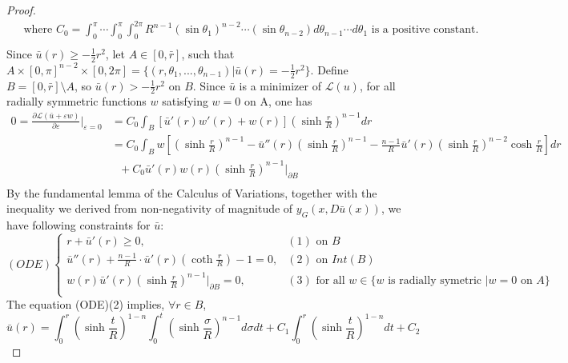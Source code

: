 \begin{proof}
\begin{equation*}
\begin{split}
	&\text{ where }	C_0=\int_{0}^{\pi}\cdots\int_{0}^{\pi}\int_{0}^{2\pi}R^{n-1}(\sin \theta_1)^{n-2}\cdots (\sin\theta_{n-2}) d\theta_{n-1}\cdots d\theta_1 \text{ is a positive constant.} \\
	\end{split}
	\end{equation*}
	Since $\bar{u}(r)\ge -\frac{1}{2}r^2$, let $A\in [0,\bar{r}]$, such that $A\times[0,\pi]^{n-2}\times[0,2\pi] = \{(r,\theta_1, ...,\theta_{n-1})| \bar{u}(r) = -\frac{1}{2}r^2\}$. Define $B =[0,\bar{r}]\setminus A$, so $\bar{u}(r)> -\frac{1}{2}r^2$ on $B$. Since $\bar{u}$ is a minimizer of $\mathcal{L}(u)$, for all radially symmetric functions $w$ satisfying $w=0$ on A, one has
	\begin{equation*}
	\begin{split}
	0=\frac{\partial \mathcal{L}(\bar{u}+\varepsilon w)}{\partial \varepsilon}\bigg|_{\varepsilon=0} &= C_0\int_B [\bar{u}'(r)w'(r)+w(r)](\sinh\frac{r}{R})^{n-1}dr\\
	&=C_0 \int_B w[(\sinh\frac{r}{R})^{n-1}-\bar{u}''(r)(\sinh\frac{r}{R})^{n-1}- \frac{n-1}{R}\bar{u}'(r)(\sinh\frac{r}{R})^{n-2}\cosh\frac{r}{R}]dr\\& \ \ \  +C_0 \bar{u}'(r)w(r)(\sinh\frac{r}{R})^{n-1}\bigg|_{\partial B}\\
	\end{split}
	\end{equation*}
	By the fundamental lemma of the Calculus of Variations, together with the inequality we derived from non-negativity of magnitude of $y_G(x, D\bar{u}(x))$, we have following constraints for $\bar{u}$:
	\begin{equation*}
	(ODE) \begin{cases} 
	r+\bar{u}'(r) \ge 0, & (1)\mbox{ on } B \\ 
	\bar{u}''(r)+\frac{n-1}{R}\cdot \bar{u}'(r)(\coth\frac{r}{R}) -1=0, & (2)\mbox{ on } Int(B) \\
	w(r)\bar{u}'(r)(\sinh\frac{r}{R})^{n-1}|_{\partial B} =0,&(3) \mbox{ for all } w\in \{w \mbox{ is radially symetric }| w= 0 \mbox{ on } A\}\\
	\end{cases}
	\end{equation*}
	The equation (ODE)(2) implies,  $\forall r \in B$,
	\begin{equation*}
	\bar{u}(r) = \int_{0}^{r}(\sinh\frac{t}{R})^{1-n} \int_{0}^{t} (\sinh\frac{\sigma }{R})^{n-1} d\sigma  dt + C_1 \int_{0}^{r}(\sinh\frac{t}{R})^{1-n} dt +C_2
	\end{equation*}

\end{proof}
